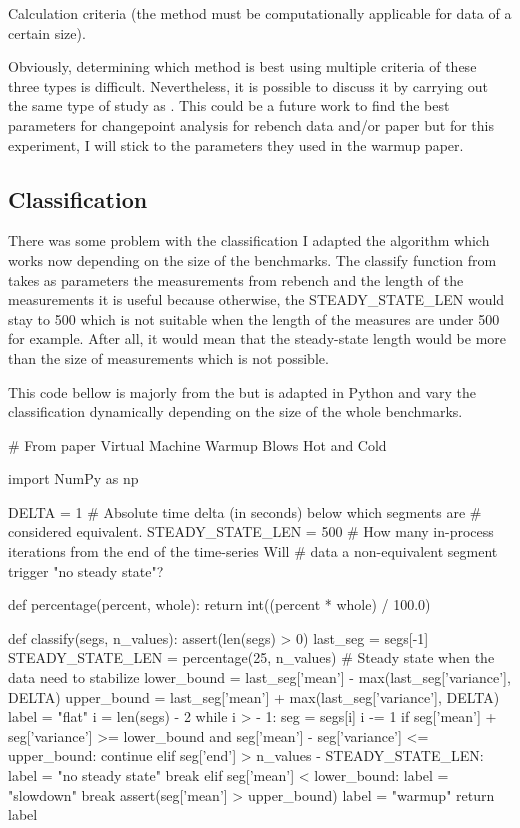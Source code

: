\documentclass{article}
\begin{document}
Calculation criteria (the method must be computationally applicable for data of a certain size).

Obviously, determining which method is best using multiple criteria of these three types is difficult. Nevertheless, it is possible to discuss it by carrying out the same type of study as \citep{leviandier2012comparison}. This could be a future work to find the best parameters for changepoint analysis for rebench data and/or \citep{barrett2017virtual} paper but for this experiment, I will stick to the parameters they used in the warmup paper.

\subsection{Classification}


There was some problem with the classification I adapted the algorithm which works now depending on the size of the benchmarks.
The classify function from \citep{barrett2017virtual} takes as parameters the measurements from rebench and the length of the measurements it is useful because otherwise, the STEADY\_STATE\_LEN would stay to 500 which is not suitable when the length of the measures are under 500 for example. After all, it would mean that the steady-state length would be more than the size of measurements which is not possible.

This code bellow is majorly from the \citep{barrett2017virtual} but is adapted in Python and vary the classification dynamically depending on the size of the whole benchmarks.
\begin{python}[h!]

# From paper Virtual Machine Warmup Blows Hot and Cold

import NumPy as np


DELTA = 1  # Absolute time delta (in seconds) below which segments are
# considered equivalent.
STEADY_STATE_LEN = 500  # How many in-process iterations from the end of the time-series
Will # data a non-equivalent segment trigger "no steady state"?


def percentage(percent, whole):
    return int((percent * whole) / 100.0)


def classify(segs, n_values):
    assert(len(segs) > 0)
    last_seg = segs[-1]
    STEADY_STATE_LEN = percentage(25, n_values) # Steady state when the data need to stabilize
    lower_bound = last_seg['mean'] - max(last_seg['variance'], DELTA)
    upper_bound = last_seg['mean'] + max(last_seg['variance'], DELTA)
    label = "flat"
    i = len(segs) - 2
    while i > - 1:
        seg = segs[i]
        i -= 1
        if seg['mean'] + seg['variance'] >= lower_bound and seg['mean'] - seg['variance'] <= upper_bound:
            continue
        elif seg['end'] > n_values - STEADY_STATE_LEN:
            label = "no steady state"
            break
        elif seg['mean'] < lower_bound:
            label = "slowdown"
            break
        assert(seg['mean'] > upper_bound)
        label = "warmup"
    return label
\end{python}
\end{document}
